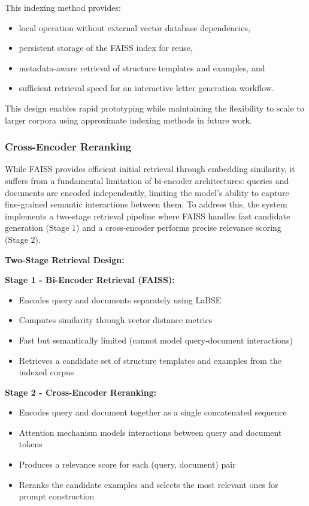 \documentclass[12pt]{uomthesis}
\begin{document}
This indexing method provides:
\begin{itemize}
    \item local operation without external vector database dependencies,
    \item persistent storage of the FAISS index for reuse,
    \item metadata-aware retrieval of structure templates and examples, and
    \item sufficient retrieval speed for an interactive letter generation workflow.
\end{itemize}

This design enables rapid prototyping while maintaining the flexibility to scale to larger corpora using approximate indexing methods in future work.

\subsubsection{Cross-Encoder Reranking}

While FAISS provides efficient initial retrieval through embedding similarity, it suffers from a fundamental limitation of bi-encoder architectures: queries and documents are encoded independently, limiting the model's ability to capture fine-grained semantic interactions between them. To address this, the system implements a two-stage retrieval pipeline where FAISS handles fast candidate generation (Stage 1) and a cross-encoder performs precise relevance scoring (Stage 2).

\textbf{Two-Stage Retrieval Design:}

\textbf{Stage 1 - Bi-Encoder Retrieval (FAISS):}
\begin{itemize}
    \item Encodes query and documents separately using LaBSE
    \item Computes similarity through vector distance metrics
    \item Fast but semantically limited (cannot model query-document interactions)
    \item Retrieves a candidate set of structure templates and examples from the indexed corpus
\end{itemize}

\textbf{Stage 2 - Cross-Encoder Reranking:}
\begin{itemize}
    \item Encodes query and document together as a single concatenated sequence
    \item Attention mechanism models interactions between query and document tokens
    \item Produces a relevance score for each (query, document) pair
    \item Reranks the candidate examples and selects the most relevant ones for prompt construction
\end{itemize}
\end{document}
